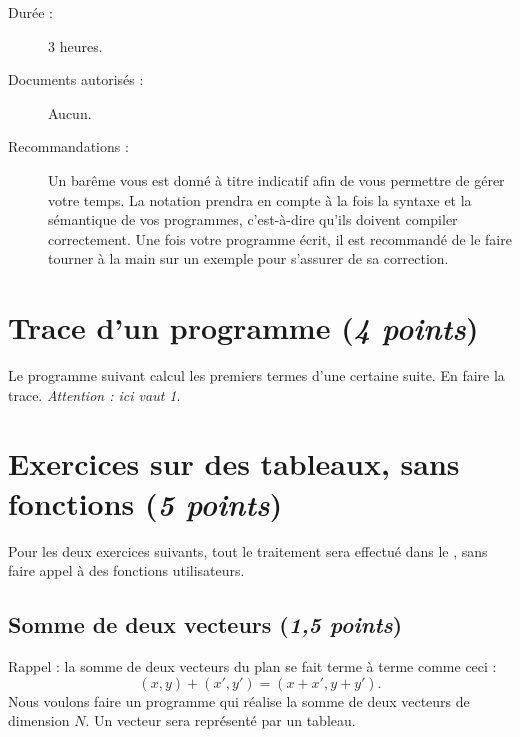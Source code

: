 
\newcommand{\commentaire}[1]{}


\vspace{-2em}
\begin{description}
\item[Durée :] 3 heures.
\item[Documents autorisés :] Aucun.
\item[Recommandations :] Un barême vous est donné à
titre indicatif afin de vous permettre de gérer votre temps. La
notation prendra en compte à la fois la syntaxe et la sémantique de
vos programmes, c'est-à-dire qu'ils doivent compiler correctement. Une
fois votre programme écrit, il est recommandé de le faire tourner à la
main sur un exemple pour s'assurer de sa correction.
\end{description}

\section{Trace d'un programme (\emph{4 points})}

Le programme suivant calcul les  premiers termes d'une certaine
suite. En faire la trace. \emph{Attention : ici  vaut 1}.


\begin{small}
\end{small}

\section{Exercices sur des tableaux, sans fonctions (\emph{5 points})}
Pour les deux exercices suivants, tout le traitement sera effectué dans
le , sans faire appel à des fonctions utilisateurs.

\subsection{Somme de deux vecteurs (\emph{1,5 points})}

Rappel : la somme de deux vecteurs du plan se fait terme à terme comme
ceci : 
\[
(x, y) + (x', y') = (x + x', y + y').
\]
Nous voulons faire un
programme qui réalise la somme de deux vecteurs de dimension $N$. Un
vecteur sera représenté par un tableau.


